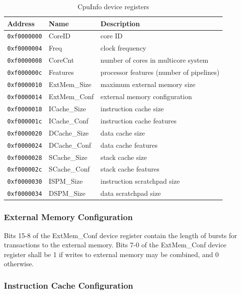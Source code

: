 \documentclass[a4paper,fontsize=10pt,twoside,DIV15,BCOR12mm,headinclude=true,footinclude=false,pagesize,bibtotoc]{scrbook}
\newcommand{\code}[1]{{\texttt{#1}}}
\begin{document}
\begin{table}
\centering
\begin{tabular}{lll}
\toprule
Address & Name & Description \\
\midrule
\code{0xf0000000} & CoreID       & core ID \\
\code{0xf0000004} & Freq         & clock frequency \\
\code{0xf0000008} & CoreCnt      & number of cores in multicore system \\
\code{0xf000000c} & Features     & processor features (number of pipelines) \\
\code{0xf0000010} & ExtMem\_Size & maximum external memory size \\
\code{0xf0000014} & ExtMem\_Conf & external memory configuration  \\
\code{0xf0000018} & ICache\_Size & instruction cache size \\
\code{0xf000001c} & ICache\_Conf & instruction cache features \\
\code{0xf0000020} & DCache\_Size & data cache size \\
\code{0xf0000024} & DCache\_Conf & data cache features \\
\code{0xf0000028} & SCache\_Size & stack cache size \\
\code{0xf000002c} & SCache\_Conf & stack cache features \\
\code{0xf0000030} & ISPM\_Size   & instruction scratchpad size \\
\code{0xf0000034} & DSPM\_Size   & data scratchpad size \\
\bottomrule
\end{tabular}
\caption{CpuInfo device registers}
\label{tab:cpuinfo}
\end{table}

\subsubsection{External Memory Configuration}

Bits 15-8 of the ExtMem\_Conf device register contain the length of
bursts for transactions to the external memory. Bits 7-0 of the
ExtMem\_Conf device register shall be 1 if writes to external memory
may be combined, and 0 otherwise.

\subsubsection{Instruction Cache Configuration}
\end{document}

